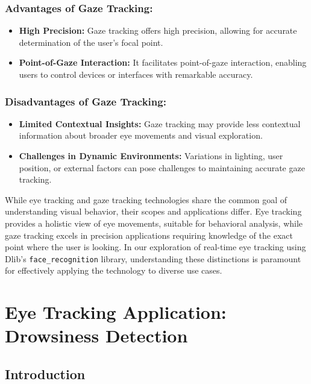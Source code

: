 \documentclass[letterpaper, 10 pt, conference]{ieeeconf}  %
\begin{document}
\subsubsection{Advantages of Gaze Tracking:}
\begin{itemize}
    \item \textbf{High Precision:} Gaze tracking offers high precision, allowing for accurate determination of the user's focal point.
    
    \item \textbf{Point-of-Gaze Interaction:} It facilitates point-of-gaze interaction, enabling users to control devices or interfaces with remarkable accuracy.
\end{itemize}

\subsubsection{Disadvantages of Gaze Tracking:}
\begin{itemize}
    \item \textbf{Limited Contextual Insights:} Gaze tracking may provide less contextual information about broader eye movements and visual exploration.
    
    \item \textbf{Challenges in Dynamic Environments:} Variations in lighting, user position, or external factors can pose challenges to maintaining accurate gaze tracking.
\end{itemize}


While eye tracking and gaze tracking technologies share the common goal of understanding visual behavior, their scopes and applications differ. Eye tracking provides a holistic view of eye movements, suitable for behavioral analysis, while gaze tracking excels in precision applications requiring knowledge of the exact point where the user is looking. In our exploration of real-time eye tracking using Dlib's \texttt{face\_recognition} library, understanding these distinctions is paramount for effectively applying the technology to diverse use cases.

\section{Eye Tracking Application: Drowsiness Detection}

\subsection{Introduction}
\end{document}
